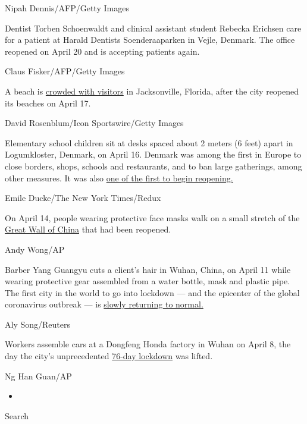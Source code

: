 Nipah Dennis/AFP/Getty Images

Dentist Torben Schoenwaldt and clinical assistant student Rebecka
Erichsen care for a patient at Harald Dentists Soenderaaparken in Vejle,
Denmark. The office reopened on April 20 and is accepting patients
again.

Claus Fisker/AFP/Getty Images

A beach is
\href{https://www.cnn.com/2020/04/17/us/jacksonville-florida-beach-reopen/index.html}{crowded
with visitors} in Jacksonville, Florida, after the city reopened its
beaches on April 17.

David Rosenblum/Icon Sportswire/Getty Images

Elementary school children sit at desks spaced about 2 meters (6 feet)
apart in Logumkloster, Denmark, on April 16. Denmark was among the first
in Europe to close borders, shops, schools and restaurants, and to ban
large gatherings, among other measures. It was also
\href{https://www.cnn.com/2020/04/11/health/european-countries-reopening-coronavirus-intl/index.html}{one
of the first to begin reopening.}

Emile Ducke/The New York Times/Redux

On April 14, people wearing protective face masks walk on a small
stretch of the
\href{https://www.cnn.com/travel/article/badaling-great-wall-china-reopens-intl-hnk/index.html}{Great
Wall of China} that had been reopened.

Andy Wong/AP

Barber Yang Guangyu cuts a client's hair in Wuhan, China, on April 11
while wearing protective gear assembled from a water bottle, mask and
plastic pipe. The first city in the world to go into lockdown --- and
the epicenter of the global coronavirus outbreak --- is
\href{https://www.cnn.com/interactive/2020/04/world/wuhan-coronavirus-cnnphotos/index.html}{slowly
returning to normal.}

Aly Song/Reuters

Workers assemble cars at a Dongfeng Honda factory in Wuhan on April 8,
the day the city's unprecedented
\href{https://www.cnn.com/interactive/2020/04/world/wuhan-coronavirus-cnnphotos/index.html}{76-day
lockdown} was lifted.

Ng Han Guan/AP

\begin{itemize}
\item
\end{itemize}

Search


